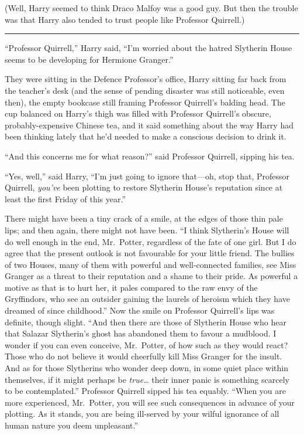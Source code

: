 (Well, Harry seemed to think Draco Malfoy was a good guy. But then the
trouble was that Harry also tended to trust people like Professor
Quirrell.)

\begin{center}\rule{3in}{0.4pt}\end{center}

``Professor Quirrell,'' Harry said, ``I'm worried about the hatred
Slytherin House seems to be developing for Hermione Granger.''

They were sitting in the Defence Professor's office, Harry sitting far
back from the teacher's desk (and the sense of pending disaster was
still noticeable, even then), the empty bookcase still framing Professor
Quirrell's balding head. The cup balanced on Harry's thigh was filled
with Professor Quirrell's obscure, probably-expensive Chinese tea, and
it said something about the way Harry had been thinking lately that he'd
needed to make a conscious decision to drink it.

``And this concerns me for what reason?'' said Professor Quirrell,
sipping his tea.

``Yes, well,'' said Harry, ``I'm just going to ignore that---oh, stop
that, Professor Quirrell, \emph{you've} been plotting to restore
Slytherin House's reputation since at least the first Friday of this
year.''

There might have been a tiny crack of a smile, at the edges of those
thin pale lips; and then again, there might not have been. ``I think
Slytherin's House will do well enough in the end, Mr.~Potter, regardless
of the fate of one girl. But I do agree that the present outlook is not
favourable for your little friend. The bullies of two Houses, many of
them with powerful and well-connected families, see Miss Granger as a
threat to their reputation and a shame to their pride. As powerful a
motive as that is to hurt her, it pales compared to the raw envy of the
Gryffindors, who see an outsider gaining the laurels of heroism which
they have dreamed of since childhood.'' Now the smile on Professor
Quirrell's lips was definite, though slight. ``And then there are those
of Slytherin House who hear that Salazar Slytherin's ghost has abandoned
them to favour a mudblood. I wonder if you can even conceive,
Mr.~Potter, of how such as they would react? Those who do not believe it
would cheerfully kill Miss Granger for the insult. And as for those
Slytherins who wonder deep down, in some quiet place within themselves,
if it might perhaps be \emph{true\ldots{}} their inner panic is
something scarcely to be contemplated.'' Professor Quirrell sipped his
tea equably. ``When you are more experienced, Mr.~Potter, you will see
such consequences in advance of your plotting. As it stands, you are
being ill-served by your wilful ignorance of all human nature you deem
unpleasant.''

